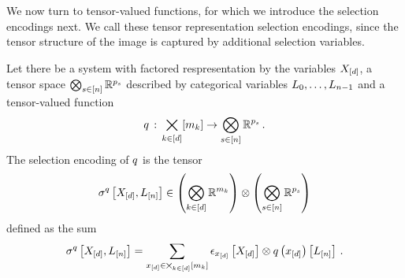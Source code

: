 \label{sec:selectionEncodingNotation}

We now turn to tensor-valued functions, for which we introduce the selection encodings next.
We call these tensor representation selection encodings, since the tensor structure of the image is captured by additional selection variables.

\begin{definition}\label{def:selectionEncoding}
	Let there be a system with factored respresentation by the variables $X_{[d]}$, a tensor space $\bigotimes_{s\in[n]}\mathbb{R}^{p_{s}}$ described by categorical variables $L_{0},\ldots,L_{n-1}$ and a tensor-valued function
	\begin{align*}
		q \,:\, \bigtimes_{k\in[d]}[m_{k}] \rightarrow \bigotimes_{s\in[n]}\mathbb{R}^{p_{s}} \, .
	\end{align*}
	The selection encoding of $q$ is the tensor
	\begin{align*}
		\sigma^{q}\left[X_{[d]},L_{[n]}\right]
		\in \left(\bigotimes_{k\in[d]} \mathbb{R}^{m_{k}}\right) \otimes \left(\bigotimes_{s\in[n]}\mathbb{R}^{p_{s}}\right)
	\end{align*}
	defined as the sum
	\begin{align*}
		 \sigma^{q}\left[X_{[d]},L_{[n]}\right]
		 = \sum_{x_{[d]}\in\bigtimes_{k\in[d]}[m_{k}]} \epsilon_{x_{[d]}}\left[X_{[d]}\right] \otimes q\left(x_{[d]}\right)\left[L_{[n]}\right] \, .
	\end{align*}
\end{definition}

